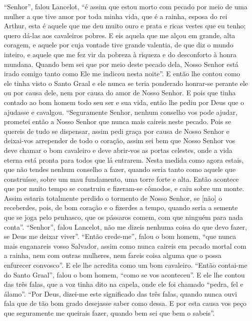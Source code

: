 “Senhor”, falou Lancelot, “é assim que estou morto com pecado por meio de uma
mulher a que tive amor por toda minha vida, que é a rainha, esposa do rei
Arthur, esta é aquele que me deu muito ouro e prata e ricas vestes que eu tenho;
quero dá-las aos cavaleiros pobres. E eis aquela que me alçou em grande, alta
coragem, e aquele por cuja vontade tive grande valentia, de que diz o mundo
inteiro, e aquele que me fez vir da pobreza à riqueza e do desconforto à honra
mundana. Quando bem sei que por meio deste pecado dela, Nosso Senhor
está irado comigo tanto como Ele me indicou nesta noite”. E então lhe contou
como ele tinha visto o Santo Graal e ele nunca se teria ponderado honrar-se
perante ele ou por causa dele, nem por causa do amor de Nosso Senhor. E pois
que tinha contado ao bom homem todo seu ser e sua vida, então lhe pediu por
Deus que o ajudasse e cavalgou. “Seguramente Senhor, nenhum conselho vos pode
ajudar, prometei então a Nosso Senhor que nunca mais caireis neste pecado. Pois
se quereis de tudo se dispensar, assim pedi graça por causa de Nosso Senhor e
deixai-vos arrepender de todo o coração, assim sei bem que Nosso Senhor vos
deve chamar o bom cavaleiro e deve abrir-vos as portas celestes, onde a vida
eterna está pronta para todos que lá entrarem. Nesta medida como agora estais,
que não tendes nenhum conselho a fazer, quando seria tanto como aquele que
construísse, sobre um mau fundamento, uma torre forte e alta. Então acontece
que por muito tempo se construiu e fizeram-se cômodos, e caiu sobre um monte.
Assim estaria totalmente perdido o tormento de Nosso Senhor, se [não] o
receberdes, pois, de bom coração e o fizerdes a tempo, quando seria a semente
que se joga pelo penhasco, que os pássaros comem, com que ninguém para nada
conta”. “Senhor”, falou Lancelot, não me dizeis nenhuma coisa
do que devo fazer, se Deus me deixar viver”. “Então crede-me”, falou o bom
homem, “que nunca mais enganareis vosso Salvador, assim como nunca caireis em
pecado mortal com a rainha, nem com outras mulheres, nem fareis coisa alguma
que o possa enfurecer convosco”. E ele lhe acredita como um bom cavaleiro. 
“Então contai-me do Santo Graal”, falou o bom homem, “como se vos
aconteceu”. E ele lhe contou das três falas, que a voz tinha dito na capela,
onde ele foi chamado “pedra, fel e álamo”. “Por Deus, dizei-me este significado
das três falas, quando nunca ouvi fala que de tão bom grado desejasse saber
como dessa. E por esta causa vos peço que seguramente me queirais fazer, quando
bem sei que bem o sabeis”. 

